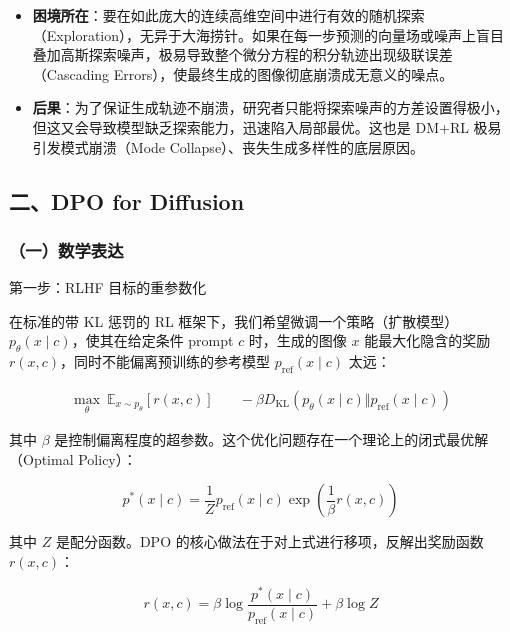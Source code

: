 \begin{itemize}
\tightlist
\item
  \textbf{困境所在}：要在如此庞大的连续高维空间中进行有效的随机探索（Exploration），无异于大海捞针。如果在每一步预测的向量场或噪声上盲目叠加高斯探索噪声，极易导致整个微分方程的积分轨迹出现级联误差（Cascading Errors），使最终生成的图像彻底崩溃成无意义的噪点。
\item
  \textbf{后果}：为了保证生成轨迹不崩溃，研究者只能将探索噪声的方差设置得极小，但这又会导致模型缺乏探索能力，迅速陷入局部最优。这也是 DM+RL 极易引发模式崩溃（Mode Collapse）、丧失生成多样性的底层原因。
\end{itemize}

\hypertarget{ux4e8cdpo-for-diffusion}{%
\subsection{二、DPO for Diffusion}\label{ux4e8cdpo-for-diffusion}}

\hypertarget{ux4e00ux6570ux5b66ux8868ux8fbe}{%
\subsubsection{（一）数学表达}\label{ux4e00ux6570ux5b66ux8868ux8fbe}}

第一步：RLHF 目标的重参数化

在标准的带 KL 惩罚的 RL 框架下，我们希望微调一个策略（扩散模型）\(p_\theta(x\mid c)\)，使其在给定条件 prompt \(c\) 时，生成的图像 \(x\) 能最大化隐含的奖励 \(r(x,c)\)，同时不能偏离预训练的参考模型 \(p_{\mathrm{ref}}(x\mid c)\) 太远：

\[
\begin{aligned}
\max_\theta\ \mathbb{E}_{x\sim p_\theta}\left[r(x,c)\right]
&\quad-\beta D_{\mathrm{KL}}\left(p_\theta(x\mid c)\Vert p_{\mathrm{ref}}(x\mid c)\right)
\end{aligned}
\]

其中 \(\beta\) 是控制偏离程度的超参数。这个优化问题存在一个理论上的闭式最优解（Optimal Policy）：

\[
p^{*}(x\mid c)=\frac{1}{Z}p_{\mathrm{ref}}(x\mid c)\exp\left(\frac{1}{\beta}r(x,c)\right)
\]

其中 \(Z\) 是配分函数。DPO 的核心做法在于对上式进行移项，反解出奖励函数 \(r(x,c)\)：

\[
r(x,c)=\beta\log\frac{p^{*}(x\mid c)}{p_{\mathrm{ref}}(x\mid c)}+\beta\log Z
\]

